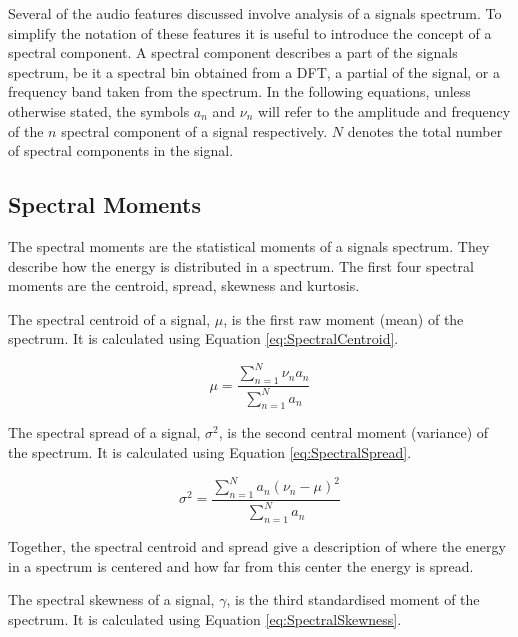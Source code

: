 
	Several of the audio features discussed involve analysis of a signals spectrum. To simplify the notation of these
	features it is useful to introduce the concept of a spectral component. A spectral component describes a part of
	the signals spectrum, be it a spectral bin obtained from a DFT, a partial of the signal, or a frequency band taken
	from the spectrum. In the following equations, unless otherwise stated, the symbols $a_{n}$ and $\nu_{n}$ will
	refer to the amplitude and frequency of the $n$ spectral component of a signal respectively. $N$ denotes
	the total number of spectral components in the signal.

	\subsection{Spectral Moments}
	\label{sec:FeatureControl-Parameterisation-SpectralMoments}
		The spectral moments are the statistical moments of a signals spectrum. They describe how the energy is
		distributed in a spectrum. The first four spectral moments are the centroid, spread, skewness and kurtosis.
		
		The spectral centroid of a signal, $\mu$, is the first raw moment (mean) of the spectrum. It is calculated
		using Equation \ref{eq:SpectralCentroid}.

		\begin{equation}
			\mu = \frac{\sum_{n = 1}^{N} \nu_{n}a_{n}}
				   {\sum_{n = 1}^{N} a_{n}}
			\label{eq:SpectralCentroid}
		\end{equation}

		The spectral spread of a signal, $\sigma^{2}$, is the second central moment (variance) of the
		spectrum. It is calculated using Equation \ref{eq:SpectralSpread}.

		\begin{equation}
			\sigma^{2} = \frac{\sum_{n = 1}^{N} a_{n}(\nu_{n} - \mu)^{2}}
					  {\sum_{n = 1}^{N} a_{n}}
			\label{eq:SpectralSpread}
		\end{equation}

		Together, the spectral centroid and spread give a description of where the energy in a spectrum is centered
		and how far from this center the energy is spread.

		The spectral skewness of a signal, $\gamma$, is the third standardised moment of the spectrum. It is
		calculated using Equation \ref{eq:SpectralSkewness}.

